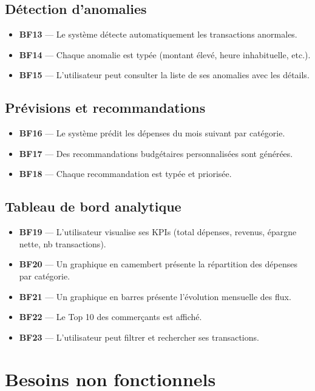 \documentclass[12pt,a4paper]{report}
\begin{document}
\subsection{Détection d'anomalies}
\begin{itemize}[noitemsep]
  \item \textbf{BF13} — Le système détecte automatiquement les transactions anormales.
  \item \textbf{BF14} — Chaque anomalie est typée (montant élevé, heure inhabituelle, etc.).
  \item \textbf{BF15} — L'utilisateur peut consulter la liste de ses anomalies avec les détails.
\end{itemize}

\subsection{Prévisions et recommandations}
\begin{itemize}[noitemsep]
  \item \textbf{BF16} — Le système prédit les dépenses du mois suivant par catégorie.
  \item \textbf{BF17} — Des recommandations budgétaires personnalisées sont générées.
  \item \textbf{BF18} — Chaque recommandation est typée et priorisée.
\end{itemize}

\subsection{Tableau de bord analytique}
\begin{itemize}[noitemsep]
  \item \textbf{BF19} — L'utilisateur visualise ses KPIs (total dépenses, revenus, épargne nette, nb transactions).
  \item \textbf{BF20} — Un graphique en camembert présente la répartition des dépenses par catégorie.
  \item \textbf{BF21} — Un graphique en barres présente l'évolution mensuelle des flux.
  \item \textbf{BF22} — Le Top 10 des commerçants est affiché.
  \item \textbf{BF23} — L'utilisateur peut filtrer et rechercher ses transactions.
\end{itemize}

\section{Besoins non fonctionnels}
\end{document}
